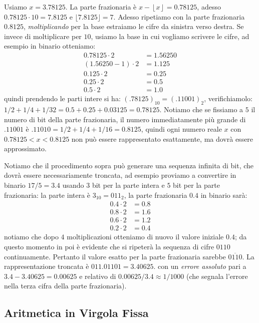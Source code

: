 \begin{ex} Usiamo $x = 3.78125$. La parte frazionaria è $x-\left\lfloor x \right \rfloor = 0.78125$, adesso
$0.78125\cdot 10 = 7.8125$ e $\lfloor 7.8125 \rfloor = 7$. 
Adesso ripetiamo con la parte frazionaria $0.8125$, \emph{moltiplicando} per la base estraiamo le cifre da sinistra verso destra.
Se invece di moltiplicare per $10$, usiamo la base in cui vogliamo scrivere le
cifre, ad esempio in binario otteniamo:
\begin{align*}
		 0.78125 \cdot 2 &= 1.56250\\
		 (1.56250-1) \cdot 2 &= 1.125\\
		 0.125 \cdot 2 &= 0.25\\
		 0.25  \cdot 2 &= 0.5\\
		 0.5 \cdot 2 &= 1.0
\end{align*}
quindi prendendo le parti intere si ha: $(.78125)_{10} = (.11001)_2$, verifichiamolo: $1/2+1/4+1/32 = 0.5 + 0.25 + 0.03125 = 0.78125$. Notiamo che se fissiamo a $5$ il numero di bit della parte frazionaria, il numero immediatamente più grande di $.11001$ è $.11010 = 1/2 + 1/4 + 1/16 = 0.8125$, quindi ogni numero reale $x$ con $0.78125  < x < 0.8125$ non può essere rappresentato esattamente, ma dovrà essere approssimato.

Notiamo che il procedimento sopra può generare una sequenza infinita di bit, che dovrà essere necessariamente troncata, ad esempio proviamo a convertire
in binario $17/5 = 3.4$ usando $3$ bit per la parte intera e $5$ bit
per la parte frazionaria: la parte intera è $3_{10} = 011_{2}$, la parte frazionaria $0.4$ in binario sarà:
\begin{align*}
		 0.4 \cdot 2 &= 0.8\\
		 0.8 \cdot 2 &= 1.6\\
		 0.6 \cdot 2 &= 1.2\\
		 0.2 \cdot 2 &= \mathbf{0.4}
\end{align*}
notiamo che dopo $4$ moltiplicazioni otteniamo di nuovo il valore iniziale $0.4$; da questo momento in poi è evidente che si ripeterà la sequenza di cifre $0110$ continuamente. Pertanto il valore esatto per la parte frazionaria sarebbe $\overline{0110}$. La rappresentazione troncata è $011.01101 = 3.40625$.
con un \emph{errore assoluto} pari a $3.4 - 3.40625 = 0.00625$ e relativo di $0.00625/3.4 \approx 1/1000$ (che segnala l'errore nella terza cifra della parte frazionaria).
\end{ex}

\subsection{Aritmetica in Virgola Fissa}

